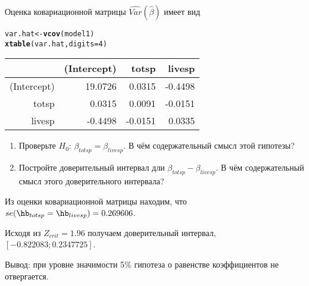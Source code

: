 \documentclass[pdftex,11pt,openany]{book}\usepackage[]{graphicx}\usepackage[]{color}
\makeatletter
\newcommand{\hlnum}[1]{\textcolor[rgb]{0.686,0.059,0.569}{#1}}%
\newcommand{\hlstd}[1]{\textcolor[rgb]{0.345,0.345,0.345}{#1}}%
\newcommand{\hlkwb}[1]{\textcolor[rgb]{0.69,0.353,0.396}{#1}}%
\newcommand{\hlkwc}[1]{\textcolor[rgb]{0.333,0.667,0.333}{#1}}%
\newcommand{\hlkwd}[1]{\textcolor[rgb]{0.737,0.353,0.396}{\textbf{#1}}}%
\newenvironment{kframe}{%
 \def\at@end@of@kframe{}%
 \ifinner\ifhmode%
  \def\at@end@of@kframe{\end{minipage}}%
  \begin{minipage}{\columnwidth}%
 \fi\fi%
 \def\FrameCommand##1{\hskip\@totalleftmargin \hskip-\fboxsep
 \colorbox{shadecolor}{##1}\hskip-\fboxsep
     \hskip-\linewidth \hskip-\@totalleftmargin \hskip\columnwidth}%
 \MakeFramed {\advance\hsize-\width
   \@totalleftmargin\z@ \linewidth\hsize
   \@setminipage}}%
 {\par\unskip\endMakeFramed%
 \at@end@of@kframe}
\makeatother
\begin{document}
\begin{problem}
Оценка ковариационной матрицы $\widehat{Var}(\hat{\beta})$ имеет вид
\begin{kframe}
\begin{alltt}
\hlstd{var.hat} \hlkwb{<-} \hlkwd{vcov}\hlstd{(model1)}
\hlkwd{xtable}\hlstd{(var.hat,} \hlkwc{digits}\hlstd{=}\hlnum{4}\hlstd{)}
\end{alltt}
\end{kframe}%
\begin{table}[ht]
\centering
\begin{tabular}{rrrr}
  \hline
 & (Intercept) & totsp & livesp \\ 
  \hline
(Intercept) & 19.0726 & 0.0315 & -0.4498 \\ 
  totsp & 0.0315 & 0.0091 & -0.0151 \\ 
  livesp & -0.4498 & -0.0151 & 0.0335 \\ 
   \hline
\end{tabular}
\end{table}


\begin{enumerate}
\item Проверьте $H_0$: $\beta_{totsp}=\beta_{livesp}$. В чём содержательный смысл этой гипотезы?
\item Постройте доверительный интервал дли $\beta_{totsp}-\beta_{livesp}$. В чём содержательный смысл этого доверительного интервала?
\end{enumerate}
\end{problem}


\begin{solution}



Из оценки ковариационной матрицы находим, что $se(\hb_{totsp}=\hb_{livesp})=0.269606$.

Исходя из $Z_{crit}=1.96$ получаем доверительный интервал, $[\ensuremath{-0.822083};0.2347725]$.

Вывод: при уровне значимости 5\% гипотеза о равенстве коэффициентов не отвергается.
\end{solution}
\end{document}
